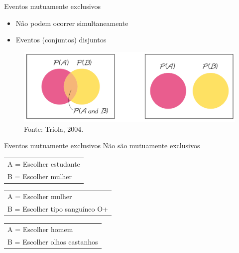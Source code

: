 \documentclass{beamer}
\begin{document}
\begin{frame}{Eventos mutuamente exclusivos}
  \begin{itemize}
  \item Não podem ocorrer simultaneamente
  \item Eventos (conjuntos) disjuntos
  \end{itemize}
  \begin{figure}
    \centering
    \includegraphics[height=0.4\textheight]{Prob_I/venn}
    \caption{Fonte: Triola, 2004.}
  \end{figure}
\end{frame}

\begin{frame}{Eventos mutuamente exclusivos}
  \alert{Não são} mutuamente exclusivos
  \begin{example}
    \begin{tabular}{l}
      A = Escolher estudante\\
      B = Escolher mulher\\
    \end{tabular}
  \end{example}
  \begin{example}
    \begin{tabular}{l}
      A = Escolher mulher\\
      B = Escolher tipo sanguíneo O+\\
    \end{tabular}
  \end{example}
  \begin{example}
    \begin{tabular}{l}
      A = Escolher homem\\
      B = Escolher olhos castanhos\\
    \end{tabular}
  \end{example}
\end{frame}
\end{document}
